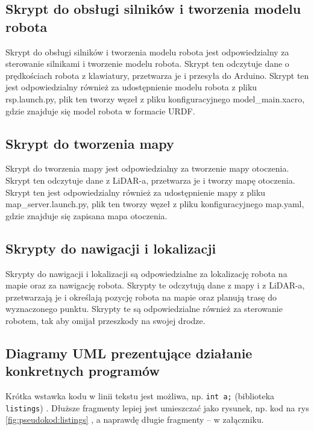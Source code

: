 \documentclass[a4paper,twoside,12pt]{book}
\begin{document}
\subsection{Skrypt do obsługi silników i tworzenia modelu robota}
Skrypt do obsługi silników i tworzenia modelu robota jest odpowiedzialny za sterowanie silnikami i tworzenie modelu robota. Skrypt ten odczytuje dane o prędkościach robota z klawiatury, przetwarza je i przesyła do Arduino. Skrypt ten jest odpowiedzialny również za udostępnienie modelu robota z pliku rsp.launch.py, plik ten tworzy węzeł z pliku konfiguracyjnego model\_main.xacro, gdzie znajduje się model robota w formacie URDF.
\subsection{Skrypt do tworzenia mapy}
Skrypt do tworzenia mapy jest odpowiedzialny za tworzenie mapy otoczenia. Skrypt ten odczytuje dane z LiDAR-a, przetwarza je i tworzy mapę otoczenia. Skrypt ten jest odpowiedzialny również za udostępnienie mapy z pliku map\_server.launch.py, plik ten tworzy węzeł z pliku konfiguracyjnego map.yaml, gdzie znajduje się zapisana mapa otoczenia.
\subsection{Skrypty do nawigacji i lokalizacji}
Skrypty do nawigacji i lokalizacji są odpowiedzialne za lokalizację robota na mapie oraz za nawigację robota. Skrypty te odczytują dane z mapy i z LiDAR-a, przetwarzają je i określają pozycję robota na mapie oraz planują trasę do wyznaczonego punktu. Skrypty te są odpowiedzialne również za sterowanie robotem, tak aby omijał przeszkody na swojej drodze.

\subsection{Diagramy UML prezentujące działanie konkretnych programów}




Krótka wstawka kodu w linii tekstu jest możliwa, np.  \lstinline|int a;| (biblioteka \texttt{listings})%
. 
Dłuższe fragmenty lepiej jest umieszczać jako rysunek, np. kod na rys \ref{fig:pseudokod:listings}%
, a naprawdę długie fragmenty – w załączniku.
\end{document}
